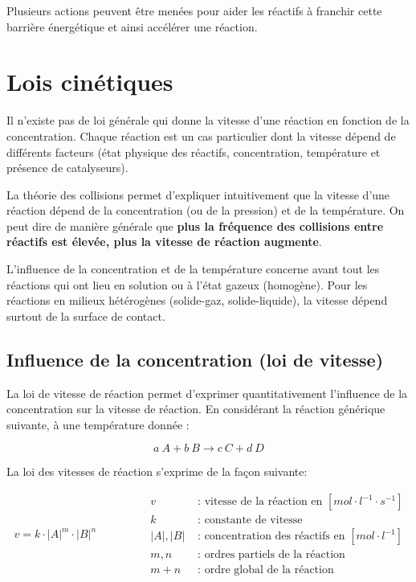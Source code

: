 \documentclass[
  11pt,
  a4paper,
  openany]{book}
\begin{document}
Plusieurs actions peuvent être menées pour aider les réactifs à franchir cette barrière énergétique et ainsi accélérer une réaction.

\hypertarget{lois-cinuxe9tiques}{%
\section{Lois cinétiques}\label{lois-cinuxe9tiques}}

Il n'existe pas de loi générale qui donne la vitesse d'une réaction en fonction de la concentration. Chaque réaction est un cas particulier dont la vitesse dépend de différents facteurs (état physique des réactifs, concentration, température et présence de catalyseurs).

La théorie des collisions permet d'expliquer intuitivement que la vitesse d'une réaction dépend de la concentration (ou de la pression) et de la température. On peut dire de manière générale que \textbf{plus la fréquence des collisions entre réactifs est élevée, plus la vitesse de réaction augmente}.

L'influence de la concentration et de la température concerne avant tout les réactions qui ont lieu en solution ou à l'état gazeux (homogène). Pour les réactions en milieux hétérogènes (solide-gaz, solide-liquide), la vitesse dépend surtout de la surface de contact.

\hypertarget{influence-de-la-concentration-loi-de-vitesse}{%
\subsection{Influence de la concentration (loi de vitesse)}\label{influence-de-la-concentration-loi-de-vitesse}}

La loi de vitesse de réaction permet d'exprimer quantitativement l'influence de la concentration sur la vitesse de réaction. En considérant la réaction générique suivante, à une température donnée :

\[
a\ A + b\ B \rightarrow c\ C + d\ D
\]

La loi des vitesses de réaction s'exprime de la façon suivante:

\[
\begin{split}
v = k \cdot |A|^m \cdot |B|^n
\end{split}
\qquad\qquad
\begin{split}
v &\text{ : vitesse de la réaction en } [mol \cdot l^{-1} \cdot s^{-1}] \\
k &\text{ : constante de vitesse} \\
|A|, |B| &\text{ : concentration des réactifs en } [mol \cdot l^{-1}] \\
m, n &\text{ : ordres partiels de la réaction} \\
m+n &\text{ : ordre global de la réaction}
\end{split}
\]
\end{document}
